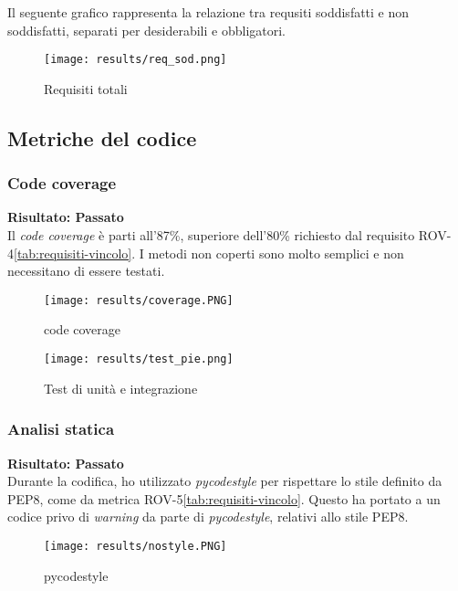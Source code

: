 Il seguente grafico rappresenta la relazione tra requsiti soddisfatti e non soddisfatti, separati per desiderabili e obbligatori.
\begin{figure}[H]
    \centering
    \texttt{[image: results/req\_sod.png]}
    \caption{Requisiti totali}
    \label{img:req_totali}
\end{figure}

\subsection{Metriche del codice} %
\subsubsection{Code coverage} %
\textbf{Risultato: Passato}\\
Il \textit{code coverage} è parti all'87\%, superiore dell'80\% richiesto dal requisito ROV-4\ref{tab:requisiti-vincolo}. I metodi non coperti sono molto semplici e non necessitano di essere testati.
\begin{figure}[H]
    \centering
    \texttt{[image: results/coverage.PNG]} 
    \caption{code coverage}
    \label{coverage}
\end{figure}
\begin{figure}[H]
    \centering
    \texttt{[image: results/test\_pie.png]} 
    \caption{Test di unità e integrazione}
    \label{img:unittests}
\end{figure}

\subsubsection{Analisi statica} %
\textbf{Risultato: Passato}\\
Durante la codifica, ho utilizzato \textit{pycodestyle} per rispettare lo stile definito da PEP8, come da metrica ROV-5\ref{tab:requisiti-vincolo}. Questo ha portato a un codice privo di \textit{warning} da parte di \textit{pycodestyle}, relativi allo stile PEP8.
\begin{figure}[H]
    \centering
    \texttt{[image: results/nostyle.PNG]} 
    \caption{pycodestyle}
    \label{coverage}
\end{figure}

